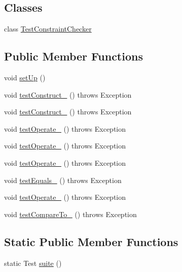 \subsection*{Classes}
\begin{DoxyCompactItemize}
\item 
class \hyperlink{classorg_1_1jgap_1_1impl_1_1_inversion_operator_test_1_1_test_constraint_checker}{Test\-Constraint\-Checker}
\end{DoxyCompactItemize}
\subsection*{Public Member Functions}
\begin{DoxyCompactItemize}
\item 
void \hyperlink{classorg_1_1jgap_1_1impl_1_1_inversion_operator_test_a0183e8c367e151a48378f293de09ef9e}{set\-Up} ()
\item 
void \hyperlink{classorg_1_1jgap_1_1impl_1_1_inversion_operator_test_ab9b8ed73478e13f31ab8196e2c5e91c4}{test\-Construct\-\_} ()  throws Exception 
\item 
void \hyperlink{classorg_1_1jgap_1_1impl_1_1_inversion_operator_test_ae0a6e5458dfb83588546f20249c3e09f}{test\-Construct\-\_} ()  throws Exception 
\item 
void \hyperlink{classorg_1_1jgap_1_1impl_1_1_inversion_operator_test_abbb074dd0eed726f99d3e8ed53014f33}{test\-Operate\-\_} ()  throws Exception 
\item 
void \hyperlink{classorg_1_1jgap_1_1impl_1_1_inversion_operator_test_a36a0419f1877033047bb97d70de9ba03}{test\-Operate\-\_} ()  throws Exception 
\item 
void \hyperlink{classorg_1_1jgap_1_1impl_1_1_inversion_operator_test_a309cf99a30aef85d7f0f54b30b6583aa}{test\-Operate\-\_} ()  throws Exception 
\item 
void \hyperlink{classorg_1_1jgap_1_1impl_1_1_inversion_operator_test_a1f9e34fa2af2ff371a4f068c3c4ccf28}{test\-Equals\-\_} ()  throws Exception 
\item 
void \hyperlink{classorg_1_1jgap_1_1impl_1_1_inversion_operator_test_a61cfc8cbd61869a662c5d3c28d3e833d}{test\-Operate\-\_} ()  throws Exception 
\item 
void \hyperlink{classorg_1_1jgap_1_1impl_1_1_inversion_operator_test_ace198e6a9edc54d286db217b38ad150c}{test\-Compare\-To\-\_} ()  throws Exception 
\end{DoxyCompactItemize}
\subsection*{Static Public Member Functions}
\begin{DoxyCompactItemize}
\item 
static Test \hyperlink{classorg_1_1jgap_1_1impl_1_1_inversion_operator_test_aa9ac90ac6709e17f44990465c3791ff4}{suite} ()
\end{DoxyCompactItemize}

